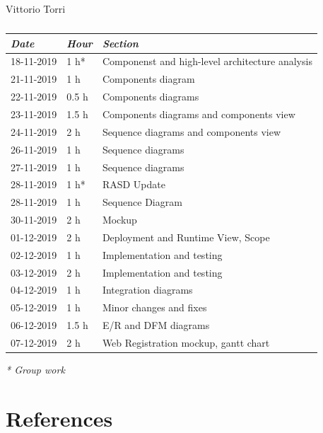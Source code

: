 \documentclass[a4paper]{report}
\begin{document}
\begin{table}[H]
\centering
Vittorio Torri \\
\begin{tabular}{p{2cm}p{1.5cm}p{7cm}}
\toprule
\textit{Date} & \textit{Hour} & \textit{Section} \\ \midrule
18-11-2019 & 1 h* & Componenst and high-level architecture analysis \\ \midrule
21-11-2019 & 1 h  & Components diagram \\ \midrule
22-11-2019 & 0.5 h & Components diagrams \\ \midrule
23-11-2019 & 1.5 h & Components diagrams and components view\\ \midrule
24-11-2019 & 2 h & Sequence diagrams and components view \\ \midrule
26-11-2019 & 1 h & Sequence diagrams \\ \midrule
27-11-2019 & 1 h & Sequence diagrams \\ \midrule
28-11-2019 & 1 h* & RASD Update \\ \midrule
28-11-2019 & 1 h & Sequence Diagram \\ \midrule
30-11-2019 & 2 h & Mockup \\ \midrule
01-12-2019 & 2 h & Deployment and Runtime View, Scope \\ \midrule
02-12-2019 & 1 h & Implementation and testing \\ \midrule
03-12-2019 & 2 h & Implementation and testing \\ \midrule
04-12-2019 & 1 h & Integration diagrams \\ \midrule
05-12-2019 & 1 h & Minor changes and fixes \\ \midrule
06-12-2019 & 1.5 h & E/R and DFM diagrams \\ \midrule
07-12-2019 & 2 h & Web Registration mockup, gantt chart \\ \midrule
\bottomrule
\end{tabular}
\caption[Vittorio Torri's effort table]{}
\end{table}
\textit{* Group work}

\chapter{References}
\end{document}

